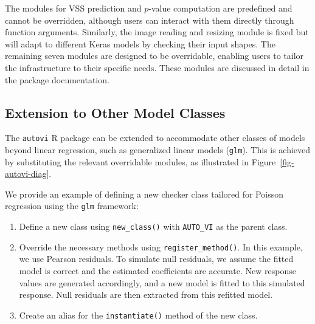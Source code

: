 \documentclass[
doublespace,
  times]{anzsauth}
\providecommand{\tightlist}{%
  \setlength{\itemsep}{0pt}\setlength{\parskip}{0pt}}\usepackage{longtable,booktabs,array}
\begin{document}
The modules for VSS prediction and \(p\)-value computation are
predefined and cannot be overridden, although users can interact with
them directly through function arguments. Similarly, the image reading
and resizing module is fixed but will adapt to different Keras models by
checking their input shapes. The remaining seven modules are designed to
be overridable, enabling users to tailor the infrastructure to their
specific needs. These modules are discussed in detail in the package
documentation.

\subsection{Extension to Other Model
Classes}\label{extension-to-other-model-classes}

The \texttt{autovi} R package can be extended to accommodate other
classes of models beyond linear regression, such as generalized linear
models (\texttt{glm}). This is achieved by substituting the relevant
overridable modules, as illustrated in Figure~\ref{fig-autovi-diag}.

We provide an example of defining a new checker class tailored for
Poisson regression using the \texttt{glm} framework:

\begin{enumerate}
\def\labelenumi{\arabic{enumi}.}
\tightlist
\item
  Define a new class using \texttt{new\_class()} with \texttt{AUTO\_VI}
  as the parent class.
\item
  Override the necessary methods using \texttt{register\_method()}. In
  this example, we use Pearson residuals. To simulate null residuals, we
  assume the fitted model is correct and the estimated coefficients are
  accurate. New response values are generated accordingly, and a new
  model is fitted to this simulated response. Null residuals are then
  extracted from this refitted model.
\item
  Create an alias for the \texttt{instantiate()} method of the new
  class.
\end{enumerate}
\end{document}
